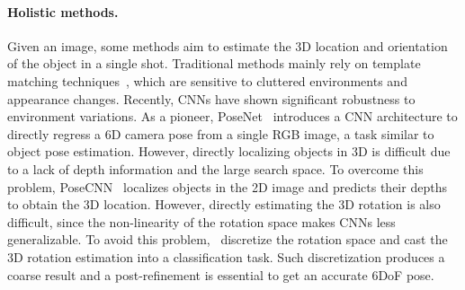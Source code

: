 \documentclass[10pt,twocolumn,letterpaper]{article}
\begin{document}
\paragraph{Holistic methods.} Given an image, some methods aim to estimate the 3D location and orientation of the object in a single shot. Traditional methods mainly rely on template matching techniques~\cite{huttenlocher1993comparing, gu2010discriminative, hinterstoisser2012gradient, zhu2014single}, which are sensitive to cluttered environments and appearance changes. Recently, CNNs have shown significant robustness to environment variations. As a pioneer, PoseNet~\cite{kendall2015posenet} introduces a CNN architecture to directly regress a 6D camera pose from a single RGB image, a task similar to object pose estimation. However, directly localizing objects in 3D is difficult due to a lack of depth information and the large search space. To overcome this problem, PoseCNN~\cite{xiang2017posecnn} localizes objects in the 2D image and predicts their depths to obtain the 3D location. However, directly estimating the 3D rotation is also difficult, since the non-linearity of the rotation space makes CNNs less generalizable. To avoid this problem,~\cite{tulsiani2015viewpoints, su2015render, liu2016ssd, sundermeyer2018implicit} discretize the rotation space and cast the 3D rotation estimation into a classification task. Such discretization produces a coarse result and a post-refinement is essential to get an accurate 6DoF pose.
\end{document}
